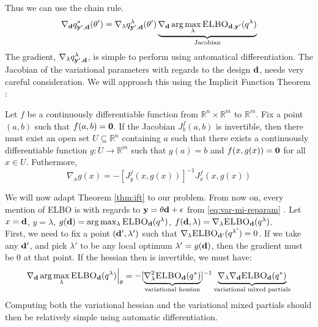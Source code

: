 Thus we can use the chain rule.
\begin{equation}
  \nabla_{\mathbf{d}} q^*_{\mathbf{y}', \mathbf{d}}(\theta') = \nabla_\lambda q^{\lambda}_{\mathbf{y}', \mathbf{d}}(\theta')\underbrace{\nabla_{\mathbf{d}} \arg \max_\lambda \textsc{ELBO}_{\mathbf{d}, \mathbf{y}'}(q^\lambda)}_{\textrm{Jacobian}}
\end{equation}
The gradient, $\nabla_\lambda q^\lambda_{\mathbf{y}',\mathbf{d}}$, is simple to perform using automatical differentiation.
The Jacobian of the variational parameters with regards to the design $\mathbf{d}$, needs very careful consideration. 
We will approach this using the Implicit Function Theorem \cite{lorraine19}:
\begin{theorem}
  Let $f$ be a continuously differentiable function from $\mathbb{R}^n \times \mathbb{R}^m$ to $\mathbb{R}^m$.
  Fix a point $(a, b)$ such that $f(a, b) = \mathbf{0}$. 
  If the Jacobian $J_b^{f}(a, b)$ is invertible, then there must exist an open set $U \subseteq \mathbb{R}^n$ containing $a$
  such that there exists a continuously differentiable function $g: U \rightarrow \mathbb{R}^m$ such that $g(a) = b$ and $f(x, g(x)) = \mathbf{0}$ for all $x \in U$.
  Futhermore,
  $$\nabla_{x}g(x) = -[J_y^f(x, g(x))]^{-1}J_{x}^{f}(x, g(x))$$
  \label{thm:ift}
\end{theorem}
We will now adapt Theorem \ref{thm:ift} to our problem. 
From now on, every mention of ELBO is with regards to $\mathbf{y} = \theta \mathbf{d} + \epsilon$ from \eqref{eq:var-mi-reparam} .
Let $x=\mathbf{d}$, $y=\lambda$, $g(\mathbf{d}) = \arg \max_{\lambda} \textsc{ELBO}_{\mathbf{d}}(q^{\lambda})$, $f(\mathbf{d}, \lambda) = \nabla_{\lambda}\textsc{ELBO}_{\mathbf{d}}(q^{\lambda})$.
\\
First, we need to fix a point $(\mathbf{d}', \lambda')$ such that $\nabla_{\lambda}\textsc{ELBO}_{\mathbf{d}'}(q^{\lambda'}) = 0$.
If we take any $\mathbf{d}'$, and pick $\lambda'$ to be any local optimum $\lambda' = g(\mathbf{d})$, then the gradient must be $0$ at that point.
If the hessian then is invertible, we must have:
\begin{equation}
  \nabla_{\mathbf{d}} \arg \max_{\lambda} \textsc{ELBO}_{\mathbf{d}}(q^{\lambda})\Bigr\rvert_{\theta}= 
  -[\underbrace{\nabla^2_{\lambda} \textsc{ELBO}_{\mathbf{d}}(q^*)}_{\textrm{variational hessian}}]^{-1}
  \underbrace{\nabla_{\lambda}\nabla_{\mathbf{d}}\textsc{ELBO}_{\mathbf{d}}(q^*)}_{\textrm{variational mixed partials}}
\end{equation}
Computing both the variational hessian and the variational mixed partials should then be relatively simple using automatic differentiation.
